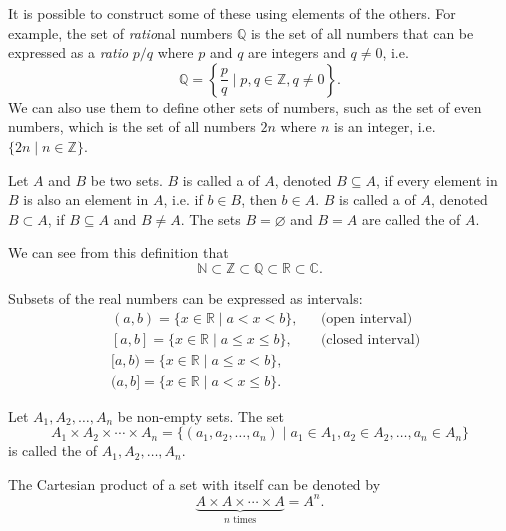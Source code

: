 It is possible to construct some of these using elements of the others. For example, the set of \emph{ratio}nal numbers $ \mathbb{Q} $ is the set of all numbers that can be expressed as a \emph{ratio} $ p/q $ where $ p $ and $ q $ are integers and $ q\neq 0 $, i.e.
\begin{equation*}
    \mathbb{Q}=\left\{\frac{p}{q}\mid p,q\in\mathbb{Z},q\neq 0\right\}.
\end{equation*}
We can also use them to define other sets of numbers, such as the set of even numbers, which is the set of all numbers $ 2n $ where $ n $ is an integer, i.e. $ \{2n\mid n\in\mathbb{Z}\} $.

\begin{defn}
Let $ A $ and $ B $ be two sets. $ B $ is called a  of $ A $, denoted $ B\subseteq A $, if every element in $ B $ is also an element in $ A $, i.e. if $ b\in B $, then $ b\in A $. $ B $ is called a  of $ A $, denoted $ B\subset A $, if $ B\subseteq A $ and $ B\neq A $. The sets $ B=\varnothing $ and $ B=A $ are called the  of $ A $.
\end{defn}

We can see from this definition that
\begin{equation*}
    \mathbb{N}\subset\mathbb{Z}\subset\mathbb{Q}\subset\mathbb{R}\subset\mathbb{C}.
\end{equation*}

Subsets of the real numbers can be expressed as intervals:
\begin{align*}
    & (a,b)=\{x\in\mathbb{R}\mid a<x<b\}, && \text{(open interval)} \\
    & [a,b]=\{x\in\mathbb{R}\mid a\leq x\leq b\}, &&\text{(closed interval)} \\
    & [a,b)=\{x\in\mathbb{R}\mid a\leq x<b \}, \\
    & (a,b]=\{x\in\mathbb{R}\mid a<x\leq b\}.
\end{align*}

\begin{defn}
Let $ A_1,A_2,\ldots,A_n $ be non-empty sets. The set
\begin{equation*}
    A_1\times A_2\times \cdots\times A_n=\{(a_1,a_2,\ldots,a_n)\mid a_1\in A_1,a_2\in A_2,\ldots,a_n\in A_n\}
\end{equation*}
is called the  of $ A_1,A_2,\ldots,A_n $.

The Cartesian product of a set with itself can be denoted by
\begin{equation*}
    \underbrace{A\times A\times\cdots\times A}_{n\text{ times}}=A^n.
\end{equation*}
\end{defn}

